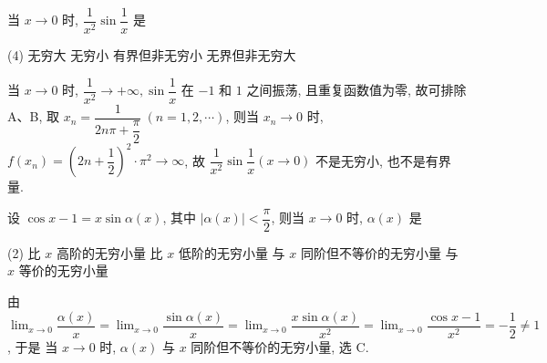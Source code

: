 \begin{example}
    当 $x\to0$ 时, $\dfrac{1}{x^2}\sin\dfrac{1}{x}$ 是 
    \begin{tasks}(4)
        \task 无穷大
        \task 无穷小
        \task 有界但非无穷小
        \task 无界但非无穷大
    \end{tasks}
\end{example}
\begin{solution}
    当 $ x \rightarrow 0 $ 时, $ \dfrac{1}{x^{2}} \rightarrow+\infty, \sin \dfrac{1}{x} $ 在 $-1$ 和 $1$ 之间振荡, 且重复函数值为零, 故可排除 A、B, 取 $ x_{n}=\dfrac{1}{2 n \pi+\dfrac{\pi}{2}}~(n=1,2, \cdots) $, 则当 $ x_{n} \rightarrow 0 $ 时, $ f\left(x_{n}\right)=\left(2 n+\dfrac{1}{2}\right)^{2} \cdot \pi^{2} \rightarrow \infty $, 故 $ \dfrac{1}{x^{2}} \sin \dfrac{1}{x}(x \rightarrow 0) $ 不是无穷小, 也不是有界量.
\end{solution}

\begin{example}
    设 $\cos x-1=x\sin\alpha(x)$, 其中 $|\alpha(x)|<\dfrac{\pi}{2}$, 则当 $x\to0$ 时, $\alpha(x)$ 是
    \begin{tasks}(2)
        \task 比 $x$ 高阶的无穷小量
        \task 比 $x$ 低阶的无穷小量
        \task 与 $x$ 同阶但不等价的无穷小量
        \task 与 $x$ 等价的无穷小量
    \end{tasks}
\end{example}
\begin{solution}
    由 $\displaystyle \lim_{x\to0}\dfrac{\alpha(x)}{x}=\lim_{x\to0}\dfrac{\sin\alpha(x)}{x}=\lim_{x\to0}\dfrac{x\sin\alpha(x)}{x^2}=\lim_{x\to0}\dfrac{\cos x-1}{x^2}=-\dfrac{1}{2}\neq1$, 于是
    当 $x\to0$ 时, $\alpha(x)$ 与 $x$ 同阶但不等价的无穷小量, 选 C.
\end{solution}


